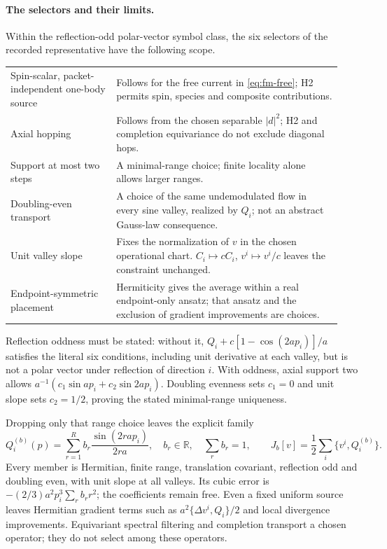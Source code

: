 \documentclass[10pt]{article}
\begin{document}
\paragraph{The selectors and their limits.}
Within the reflection-odd polar-vector symbol class, the six
selectors of the recorded representative have the following scope.
\begin{center}
\begin{tabular}{p{0.30\linewidth}p{0.64\linewidth}}
Spin-scalar, packet-independent one-body source &
Follows for the free current in \eqref{eq:fm-free}; H2 permits
spin, species and composite contributions.\\[3pt]
Axial hopping &
Follows from the chosen separable $|d|^2$; H2 and completion
equivariance do not exclude diagonal hops.\\[3pt]
Support at most two steps &
A minimal-range choice; finite locality alone allows larger ranges.\\[3pt]
Doubling-even transport &
A choice of the same undemodulated flow in every sine valley,
realized by $Q_i$; not an abstract Gauss-law consequence.\\[3pt]
Unit valley slope &
Fixes the normalization of $v$ in the chosen operational chart.
$C_i\mapsto cC_i$, $v^i\mapsto v^i/c$ leaves the constraint
unchanged.\\[3pt]
Endpoint-symmetric placement &
Hermiticity gives the average within a real endpoint-only ansatz;
that ansatz and the exclusion of gradient improvements are choices.
\end{tabular}
\end{center}
Reflection oddness must be stated: without it,
$Q_i+c[1-\cos(2ap_i)]/a$ satisfies the literal six conditions,
including unit derivative at each valley, but is not a polar vector
under reflection of direction $i$. With oddness, axial support two
allows $a^{-1}(c_1\sin ap_i+c_2\sin2ap_i)$. Doubling evenness
sets $c_1=0$ and unit slope sets $c_2=1/2$, proving the stated
minimal-range uniqueness.

Dropping only that range choice leaves the explicit family
\begin{equation}
 Q_i^{(b)}(p)=\sum_{r=1}^{R}b_r\frac{\sin(2rap_i)}{2ra},
 \quad b_r\in\mathbb R,\quad\sum_rb_r=1,\qquad
 J_b[v]=\frac12\sum_i\{v^i,Q_i^{(b)}\}.
 \label{eq:fm-family}
\end{equation}
Every member is Hermitian, finite range, translation covariant,
reflection odd and doubling even, with unit slope at all valleys.
Its cubic error is $-(2/3)a^2p_i^3\sum_rb_rr^2$; the coefficients
remain free. Even a fixed uniform source leaves Hermitian gradient
terms such as $a^2\{\Delta v^i,Q_i\}/2$ and local divergence
improvements. Equivariant spectral filtering and completion
transport a chosen operator; they do not select among these
operators.
\end{document}
